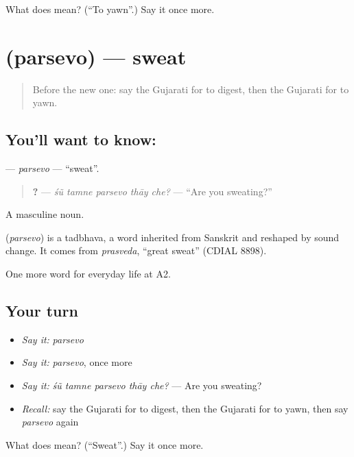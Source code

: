 \begin{tcolorbox}[breakable,colback=teal!4,colframe=teal!35!black,title={Before you move on}]
What does   mean? (\textquotedblleft{}To yawn\textquotedblright{}.) Say it once more.
\end{tcolorbox}
\section[\texorpdfstring{\gu{પરસેવો} (parsevo)}{પરસેવો (parsevo)}]{ (parsevo) — sweat}

\label{lesson:GU-C225-parsevo}



\begin{quote}
Before the new one: say the Gujarati for to digest, then the Gujarati for to yawn.
\end{quote}

\subsection*{You'll want to know: }
\textbf{} — \emph{parsevo} — \textquotedblleft{}sweat\textquotedblright{}.

\begin{quote}
\textbf{    ?} — \emph{śũ tamne parsevo thāy che?} — \textquotedblleft{}Are you sweating?\textquotedblright{}
\end{quote}

A masculine noun.

\begin{cousinweb}
\textbf{} (\emph{parsevo}) is a tadbhava, a word inherited from Sanskrit and reshaped by sound change. It comes from \emph{prasveda}, \textquotedblleft{}great sweat\textquotedblright{} (CDIAL 8898).
\end{cousinweb}

\begin{grammarlens}[title={What you've built}]
One more word for everyday life at A2.
\end{grammarlens}

\subsection*{Your turn}
\begin{itemize}
\raggedright
  \item \emph{Say it:} \emph{parsevo}
  \item \emph{Say it:} \emph{parsevo}, once more
  \item \emph{Say it:} \emph{śũ tamne parsevo thāy che?} — Are you sweating?
  \item \emph{Recall:} say the Gujarati for to digest, then the Gujarati for to yawn, then say \emph{parsevo} again
\end{itemize}

\begin{tcolorbox}[breakable,colback=teal!4,colframe=teal!35!black,title={Before you move on}]
What does  mean? (\textquotedblleft{}Sweat\textquotedblright{}.) Say it once more.
\end{tcolorbox}
